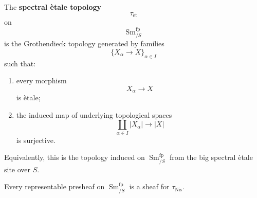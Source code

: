 \begin{definition}
\label{def:spectral-etale-topology-smooth-site}
The \textbf{spectral \`etale topology}
\[
    \tau_{\mathrm{\acute et}}
\]
on
\[
    \operatorname{Sm}^{\mathrm{fp}}_{/S}
\]
is the Grothendieck topology generated by families
\[
    \{X_\alpha\to X\}_{\alpha\in I}
\]
such that:
\begin{enumerate}[label=(\roman*)]
    \item every morphism
    \[
        X_\alpha
        \longrightarrow
        X
    \]
    is \`etale;

    \item the induced map of underlying topological spaces
    \[
        \coprod_{\alpha\in I}|X_\alpha|
        \longrightarrow
        |X|
    \]
    is surjective.
\end{enumerate}
Equivalently, this is the topology induced on
\(\operatorname{Sm}^{\mathrm{fp}}_{/S}\) from the big spectral
\`etale site over \(S\).
\end{definition}

\begin{theorem}
\label{thm:spectral-nisnevich-subcanonical}
Every representable presheaf on
\(\operatorname{Sm}^{\mathrm{fp}}_{/S}\) is a sheaf for
\(\tau_{\mathrm{Nis}}\).
\end{theorem}

